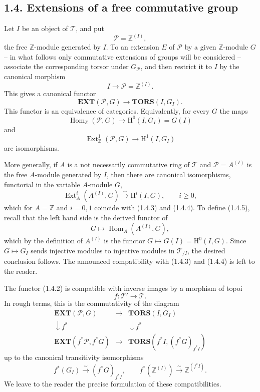 \documentclass[11pt]{article}
\theoremstyle{plain}
\theoremstyle{definition}
\theoremstyle{remark}
\DeclareMathOperator{\Hom}{Hom}
\DeclareMathOperator{\Ext}{Ext}
\begin{document}
\subsection*{1.4. Extensions of a free commutative group}

Let $I$ be an object of $\mathcal T$, and put
\begin{equation}
\mathcal P=\mathbb Z^{(I)},
\tag{1.4.1}
\end{equation}
the free $\mathbb Z$-module generated by $I$. To an extension $E$ of $\mathcal P$ by a given $\mathbb Z$-module $G$ -- in what follows only commutative extensions of groups will be considered -- associate the corresponding torsor under $G_{\mathcal P}$, and then restrict it to $I$ by the canonical morphism
\[
I\longrightarrow \mathcal P=\mathbb Z^{(I)}.
\]
This gives a canonical functor
\begin{equation}
\mathbf{EXT}(\mathcal P,G)\longrightarrow \mathbf{TORS}(I,G_I).
\tag{1.4.2}
\end{equation}
This functor is an equivalence of categories. Equivalently, for every $G$ the maps
\begin{equation}
\Hom_{\mathbb Z}(\mathcal P,G)\longrightarrow \mathrm H^0(I,G_I)=G(I)
\tag{1.4.3}
\end{equation}
and
\begin{equation}
\Ext^1_{\mathbb Z}(\mathcal P,G)\longrightarrow \mathrm H^1(I,G_I)
\tag{1.4.4}
\end{equation}
are isomorphisms.

More generally, if $A$ is a not necessarily commutative ring of $\mathcal T$ and $\mathcal P=A^{(I)}$ is the free $A$-module generated by $I$, then there are canonical isomorphisms, functorial in the variable $A$-module $G$,
\begin{equation}
\Ext_A^i(A^{(I)},G)\xrightarrow{\sim}\mathrm H^i(I,G),\qquad i\ge0,
\tag{1.4.5}
\end{equation}
which for $A=\mathbb Z$ and $i=0,1$ coincide with (1.4.3) and (1.4.4). To define (1.4.5), recall that the left hand side is the derived functor of
\[
G\longmapsto \Hom_A(A^{(I)},G),
\]
which by the definition of $A^{(I)}$ is the functor $G\mapsto G(I)=\mathrm H^0(I,G)$. Since $G\mapsto G_I$ sends injective modules to injective modules in $\mathcal T_{/I}$, the desired conclusion follows. The announced compatibility with (1.4.3) and (1.4.4) is left to the reader.

The functor (1.4.2) is compatible with inverse images by a morphism of topoi
\[
f:\mathcal T'\longrightarrow\mathcal T.
\]
In rough terms, this is the commutativity of the diagram
\[
\begin{array}{ccc}
\mathbf{EXT}(\mathcal P,G)&\longrightarrow&\mathbf{TORS}(I,G_I)\\
\downarrow f^*&&\downarrow f^*\\
\mathbf{EXT}(f^*\mathcal P,f^*G)&\longrightarrow&\mathbf{TORS}(f^*I,(f^*G)_{f^*I})
\end{array}
\]
up to the canonical transitivity isomorphisms
\[
f^*(G_I)\xrightarrow{\sim}(f^*G)_{f^*I},\qquad
f^*(\mathbb Z^{(I)})\xrightarrow{\sim}\mathbb Z^{(f^*I)}.
\]
We leave to the reader the precise formulation of these compatibilities.
\end{document}
